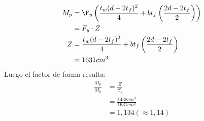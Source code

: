 \begin{example}
\begin{align*}
    M_p &= \F_y\left(\frac{t_w(d-2t_f)^2}{4}+bt_f\left(\frac{2d-2t_f}{2}\right)\right)\\
        &= F_y\cdot Z\\
      Z &= \frac{t_w(d-2t_f)^2}{4}+bt_f\left(\frac{2d-2t_f}{2}\right)\\
        &= 1631cm^3\\
\end{align*}
Luego el factor de forma resulta:\\
\begin{align*}
    \frac{M_p}{M_y} &= \frac{Z}{S_y}\\
                    &= \frac{1438cm^3}{1631cm^3}\\
                    &= 1,134 (\approx 1,14)\\
\end{align*}
\end{example}
